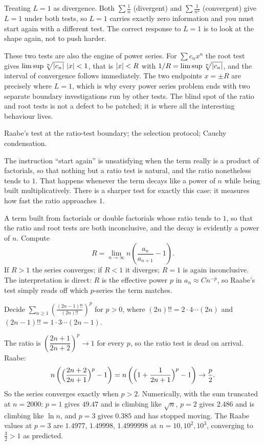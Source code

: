 \begin{trap}
Treating $L=1$ as divergence. Both $\sum\tfrac1n$ (divergent) and $\sum\tfrac{1}{n^2}$ (convergent) give $L=1$ under both tests, so $L=1$ carries exactly zero information and you must start again with a different test. The correct response to $L=1$ is to look at the shape again, not to push harder.
\end{trap}

These two tests are also the engine of power series. For $\sum c_nx^n$ the root test gives $\limsup\sqrt[n]{\left\lvert c_n\right\rvert}\,\left\lvert x\right\rvert<1$, that is $\left\lvert x\right\rvert<R$ with $1/R=\limsup\sqrt[n]{\left\lvert c_n\right\rvert}$, and the interval of convergence follows immediately. The two endpoints $x=\pm R$ are precisely where $L=1$, which is why every power series problem ends with two separate boundary investigations run by other tests. The blind spot of the ratio and root tests is not a defect to be patched; it is where all the interesting behaviour lives.

\begin{seealsob}Raabe's test at the ratio-test boundary; the selection protocol; Cauchy condensation.\end{seealsob}

The instruction ``start again'' is unsatisfying when the term really is a product of factorials, so that nothing but a ratio test is natural, and the ratio nonetheless tends to $1$. That happens whenever the term decays like a power of $n$ while being built multiplicatively. There is a sharper test for exactly this case: it measures how fast the ratio approaches $1$.

\cue A term built from factorials or double factorials whose ratio tends to $1$, so that the ratio and root tests are both inconclusive, and the decay is evidently a power of $n$.
\method Compute
\[R=\lim_{n\to\infty}n\left(\frac{a_n}{a_{n+1}}-1\right).\]
If $R>1$ the series converges; if $R<1$ it diverges; $R=1$ is again inconclusive. The interpretation is direct: $R$ is the effective power $p$ in $a_n\approx Cn^{-p}$, so Raabe's test simply reads off which $p$-series the term matches.

\begin{worked}
Decide $\displaystyle\sum_{n\geq1}\left(\frac{(2n-1)!!}{(2n)!!}\right)^{p}$ for $p>0$, where $(2n)!!=2\cdot4\cdots(2n)$ and $(2n-1)!!=1\cdot3\cdots(2n-1)$.

The ratio is $\left(\dfrac{2n+1}{2n+2}\right)^{p}\to1$ for every $p$, so the ratio test is dead on arrival. Raabe:
\[n\left(\Bigl(\frac{2n+2}{2n+1}\Bigr)^{p}-1\right)=n\left(\Bigl(1+\frac{1}{2n+1}\Bigr)^{p}-1\right)\to\frac{p}{2}.\]
So the series converges exactly when $p>2$. Numerically, with the sum truncated at $n=2000$: $p=1$ gives $49.47$ and is climbing like $\sqrt n$, $p=2$ gives $2.486$ and is climbing like $\ln n$, and $p=3$ gives $0.385$ and has stopped moving. The Raabe values at $p=3$ are $1.4977$, $1.49998$, $1.4999998$ at $n=10,10^2,10^3$, converging to $\tfrac32>1$ as predicted.
\end{worked}

